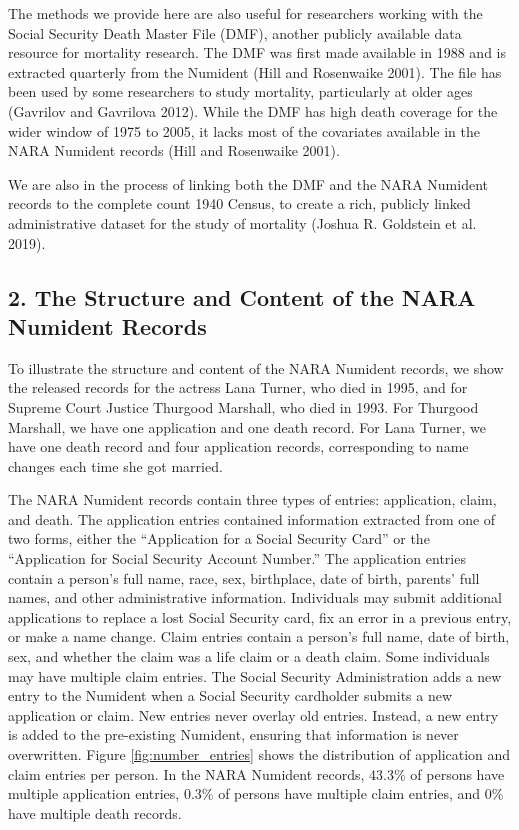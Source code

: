 \documentclass[
  11pt,
]{article}
\begin{document}
The methods we provide here are also useful for researchers working with
the Social Security Death Master File (DMF), another publicly available
data resource for mortality research. The DMF was first made available
in 1988 and is extracted quarterly from the Numident (Hill and
Rosenwaike 2001). The file has been used by some researchers to study
mortality, particularly at older ages (Gavrilov and Gavrilova 2012).
While the DMF has high death coverage for the wider window of 1975 to
2005, it lacks most of the covariates available in the NARA Numident
records (Hill and Rosenwaike 2001).

We are also in the process of linking both the DMF and the NARA Numident
records to the complete count 1940 Census, to create a rich, publicly
linked administrative dataset for the study of mortality (Joshua R.
Goldstein et al. 2019).

\hypertarget{the-structure-and-content-of-the-nara-numident-records}{%
\subsection{2. The Structure and Content of the NARA Numident
Records}\label{the-structure-and-content-of-the-nara-numident-records}}

To illustrate the structure and content of the NARA Numident records, we
show the released records for the actress Lana Turner, who died in 1995,
and for Supreme Court Justice Thurgood Marshall, who died in 1993. For
Thurgood Marshall, we have one application and one death record. For
Lana Turner, we have one death record and four application records,
corresponding to name changes each time she got married.

\begin{landscape}

\end{landscape}

The NARA Numident records contain three types of entries: application,
claim, and death. The application entries contained information
extracted from one of two forms, either the ``Application for a Social
Security Card'' or the ``Application for Social Security Account
Number.'' The application entries contain a person's full name, race,
sex, birthplace, date of birth, parents' full names, and other
administrative information. Individuals may submit additional
applications to replace a lost Social Security card, fix an error in a
previous entry, or make a name change. Claim entries contain a person's
full name, date of birth, sex, and whether the claim was a life claim or
a death claim. Some individuals may have multiple claim entries. The
Social Security Administration adds a new entry to the Numident when a
Social Security cardholder submits a new application or claim. New
entries never overlay old entries. Instead, a new entry is added to the
pre-existing Numident, ensuring that information is never overwritten.
Figure \ref{fig:number_entries} shows the distribution of application
and claim entries per person. In the NARA Numident records, 43.3\% of
persons have multiple application entries, 0.3\% of persons have
multiple claim entries, and 0\% have multiple death records.
\end{document}
